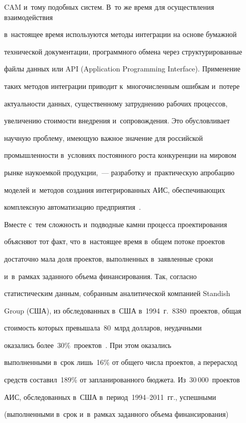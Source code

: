 CAM и~тому подобных сис\-тем. В~то же время для осуществления взаимодействия 


в~настоящее время используются методы интеграции на основе бумажной 


технической документации, программного обмена через структурированные 


файлы данных или API (Application Programming Interface). Применение 


таких методов интеграции приводит к~многочисленным ошибкам и~потере 


актуальности данных, существенному затруднению рабочих процессов, 


увеличению стоимости внедрения и~сопровождения. Это обусловливает 


научную проблему, имеющую важное значение для российской 


промышленности в~условиях постоянного роста конкуренции на мировом 


рынке наукоемкой продукции,~--- разработку и~практическую апробацию 


моделей и~методов создания интегрированных АИС, обеспечивающих 


комплексную автоматизацию предприятия~\cite{25-luk}.


     


     Вместе с~тем сложность и~подводные камни процесса проектирования 


объясняют тот факт, что в~настоящее время в~общем потоке проектов 


достаточно мала доля проектов, выполненных в~заявленные сроки 


и~в~рамках заданного объема финансирования. Так, согласно 


статистическим данным, собранным аналитической компанией Standish 


Group (США), из обследованных в~США в~1994~г.\ 8380~проектов, общая 


стоимость которых превышала~80~млрд долларов, неудачными 


оказались более~30\%~проектов~\cite{24-luk}. При этом оказались 


выполненными в~срок лишь~16\% от общего числа проектов, а перерасход 


средств составил~189\% от запланированного бюджета. Из~30\,000~проектов 


АИС, обследованных в~США в~период~1994--2011~гг., успешными 


(выполненными в~срок и~в~рамках заданного объема финансирования) 


